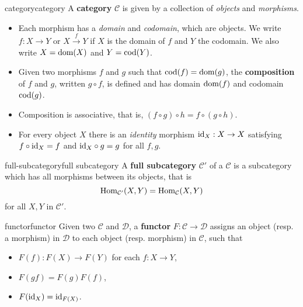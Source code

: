 \begin{topic}{category}{category}
    A \textbf{category} $\mathcal{C}$ is given by a collection of \textit{objects} and \textit{morphisms}.
    \begin{itemize}
        \item Each morphism has a \textit{domain} and \textit{codomain}, which are objects. We write $f : X \to Y$ or $X \overset{f}{\to} Y$ if $X$ is the domain of $f$ and $Y$ the codomain. We also write $X = \textup{dom}(X)$ and $Y = \textup{cod}(Y)$.
        
        \item Given two morphisms $f$ and $g$ such that $\textup{cod}(f) = \textup{dom}(g)$, the \textbf{composition} of $f$ and $g$, written $g \circ f$, is defined and has domain $\textup{dom}(f)$ and codomain $\textup{cod}(g)$.
        
        \item Composition is associative, that is, $(f \circ g) \circ h = f \circ (g \circ h)$.
        
        \item For every object $X$ there is an \textit{identity} morphism $\textup{id}_X : X \to X$ satisfying $f \circ \textup{id}_X = f$ and $\textup{id}_X \circ g = g$ for all $f, g$.
    \end{itemize}
\end{topic}

\begin{topic}{full-subcategory}{full subcategory}
    A \textbf{full subcategory} $\mathcal{C}'$ of a  $\mathcal{C}$ is a subcategory which has all morphisms between its objects, that is
    \[ \operatorname{Hom}_{\mathcal{C}'}(X, Y) = \operatorname{Hom}_{\mathcal{C}}(X, Y) \]
    for all $X, Y$ in $\mathcal{C}'$.
\end{topic}

\begin{topic}{functor}{functor}
    Given two  $\mathcal{C}$ and $\mathcal{D}$, a \textbf{functor} $F : \mathcal{C} \to \mathcal{D}$ assigns an object (resp. a morphism) in $\mathcal{D}$ to each object (resp. morphism) in $\mathcal{C}$, such that
    \begin{itemize}
        \item $F(f) : F(X) \to F(Y)$ for each $f : X \to Y$,
        \item $F(gf) = F(g) F(f)$,
        \item $F(\textup{id}_X) = \textup{id}_{F(X)}$.
    \end{itemize}
\end{topic}

